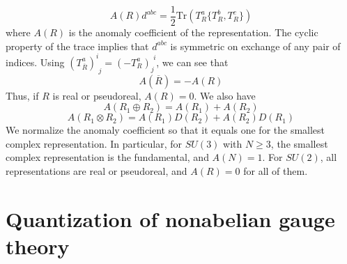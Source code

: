 \[A(R)d^{abc} = \frac{1}{2} \mathrm{Tr}(T^a_R\{T^b_R,T^c_R\})\]
where $A(R)$ is the anomaly coefficient of the representation. The cyclic property of the trace implies that $d^{abc}$ is symmetric on exchange of any pair of indices. Using $(T^{a}_{\overline{R}})^{i}_{\phantom{i}j} = (-T^{a}_R)_{j}^{\phantom{i}i}$, we can see that
\[A(\overline{R}) = -A(R)\]
Thus, if $R$ is real or pseudoreal, $A(R) = 0$. We also have
\[A(R_1\oplus R_2) = A(R_1) + A(R_2)\]
\[A(R_1\otimes R_2) = A(R_1)D(R_2) + A(R_2)D(R_1)\]
We normalize the anomaly coefficient so that it equals one for the smallest complex representation. In particular, for $SU(3)$ with $N \geq 3$, the smallest complex representation is the fundamental, and $A(N) = 1$. For $SU(2)$, all representations are real or pseudoreal, and $A(R) = 0$ for all of them.

\section{Quantization of nonabelian gauge theory}
